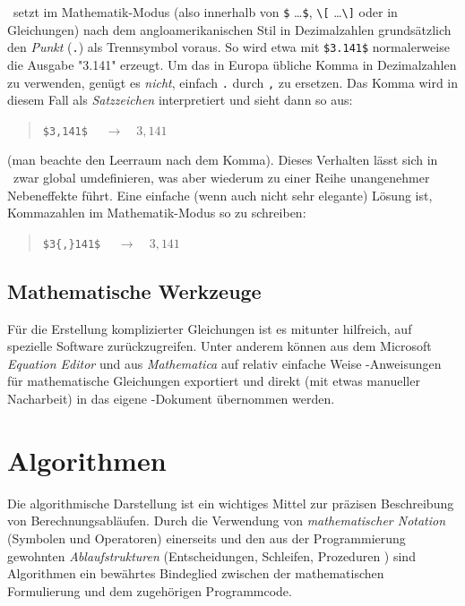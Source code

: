 \latex\ setzt im Mathematik-Modus (also innerhalb von \verb!$! \ldots \verb!$!,
\verb!\[! \ldots \verb!\]! oder in Gleichungen) nach dem angloamerikanischen
Stil in Dezimalzahlen grundsätzlich den \emph{Punkt} (\verb!.!) als Trennsymbol
voraus. So wird etwa mit \verb!$3.141$! normalerweise die Ausgabe "3.141"
erzeugt. Um das in Europa übliche Komma in Dezimalzahlen zu verwenden, genügt
es \emph{nicht}, einfach \verb!.! durch \verb!,! zu ersetzen. Das Komma wird
in diesem Fall als \emph{Satzzeichen} interpretiert und sieht dann so aus:
%
\begin{quote}
	\verb!$3,141$! $\quad \rightarrow \quad 3,141$
\end{quote}
%
(man beachte den Leerraum nach dem Komma). Dieses Verhalten lässt sich in
\latex\ zwar global umdefinieren, was aber wiederum zu einer Reihe
unangenehmer Nebeneffekte führt. Eine einfache (wenn auch nicht sehr
elegante) Lösung ist, Kommazahlen im Mathematik-Modus so zu schreiben:
%
\begin{quote}
	\verb!$3{,}141$! $\quad \rightarrow \quad 3{,}141$
\end{quote}


\subsection{Mathematische Werkzeuge}

Für die Erstellung komplizierter Gleichungen ist es mitunter hilfreich, auf
spezielle Software zurückzugreifen. Unter anderem können aus dem Microsoft
\emph{Equation Editor} und aus {\em Mathematica} auf relativ einfache Weise
\latex-An\-wei\-sun\-gen für mathematische Gleichungen exportiert und direkt
(mit etwas manueller Nacharbeit) in das eigene \latex-Dokument übernommen
werden.


\section{Algorithmen}

Die algorithmische Darstellung ist ein wichtiges Mittel zur präzisen
Beschreibung von Berechnungsabläufen. Durch die Verwendung von
\emph{mathematischer Notation} (Symbolen und Operatoren) einerseits und den
aus der Programmierung gewohnten \emph{Ablaufstrukturen} (Entscheidungen,
Schleifen, Prozeduren \etc) sind Algorithmen ein bewährtes Bindeglied
zwischen der mathematischen Formulierung und dem zugehörigen Programmcode.

